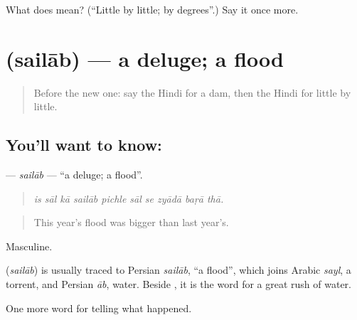 \begin{tcolorbox}[breakable,colback=teal!4,colframe=teal!35!black,title={Before you move on}]
What does  mean? (\textquotedblleft{}Little by little; by degrees\textquotedblright{}.) Say it once more.
\end{tcolorbox}
\section[\texorpdfstring{\hi{सैलाब} (sailāb)}{सैलाब (sailāb)}]{ (sailāb) — a deluge; a flood}

\label{lesson:HI-C305-sailab}



\begin{quote}
Before the new one: say the Hindi for a dam, then the Hindi for little by little.
\end{quote}

\subsection*{You'll want to know: }
\textbf{} — \emph{sailāb} — \textquotedblleft{}a deluge; a flood\textquotedblright{}.

\begin{quote}
         
\end{quote}

\begin{quote}
\emph{is sāl kā sailāb pichle sāl se zyādā baṛā thā.}
\end{quote}

\begin{quote}
This year's flood was bigger than last year's.
\end{quote}

Masculine.

\begin{cousinweb}
\textbf{} (\emph{sailāb}) is usually traced to Persian \emph{sailāb}, \textquotedblleft{}a flood\textquotedblright{}, which joins Arabic \emph{sayl}, a torrent, and Persian \emph{āb}, water. Beside \textbf{}, it is the word for a great rush of water.
\end{cousinweb}

\begin{grammarlens}[title={What you've built}]
One more word for telling what happened.
\end{grammarlens}

